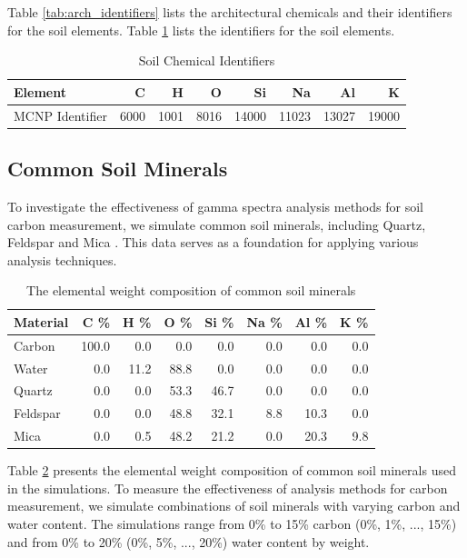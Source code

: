 \documentclass[preprint, 12pt]{elsarticle}
\begin{document}
Table \ref{tab:arch_identifiers} lists the architectural chemicals and their identifiers for the soil elements. Table \ref{tab:chemical_identifiers} lists the identifiers for the soil elements.

\begin{table}[H]
    \centering
    \caption{Soil Chemical Identifiers}
    \label{tab:chemical_identifiers}
    \begin{tabular}{lrrrrrrr}
    \hline
    Element         &    C &    H &    O &    Si &    Na &    Al &     K \\
    \hline
    MCNP Identifier & 6000 & 1001 & 8016 & 14000 & 11023 & 13027 & 19000 \\
    \hline
    \end{tabular}
\end{table}

\subsection{Common Soil Minerals}

To investigate the effectiveness of gamma spectra analysis methods for soil carbon measurement, we simulate common soil minerals, including Quartz, Feldspar and Mica \cite{sposito_chemistry_2008}. This data serves as a foundation for applying various analysis techniques.

\begin{table}[H]
\centering
\caption{The elemental weight composition of common soil minerals}
\label{tab:materials}
\begin{tabular}{l @{\extracolsep{\fill}} rrrrrrr}
\hline
 Material   &   C \% &   H \% &   O \% &   Si \% &   Na \% &   Al \% &   K \% \\
\hline
 Carbon     & 100.0 &   0.0 &   0.0 &    0.0 &    0.0 &    0.0 &   0.0 \\
 Water      &   0.0 &  11.2 &  88.8 &    0.0 &    0.0 &    0.0 &   0.0 \\
 Quartz     &   0.0 &   0.0 &  53.3 &   46.7 &    0.0 &    0.0 &   0.0 \\
 Feldspar   &   0.0 &   0.0 &  48.8 &   32.1 &    8.8 &   10.3 &   0.0 \\
 Mica       &   0.0 &   0.5 &  48.2 &   21.2 &    0.0 &   20.3 &   9.8 \\
\hline
\end{tabular}
\end{table}

Table \ref{tab:materials} presents the elemental weight composition of common soil minerals used in the simulations. To measure the effectiveness of analysis methods for carbon measurement, we simulate combinations of soil minerals with varying carbon and water content. The simulations range from 0\% to 15\% carbon (0\%, 1\%, ..., 15\%) and from 0\% to 20\% (0\%, 5\%, ..., 20\%) water content by weight.
\end{document}
